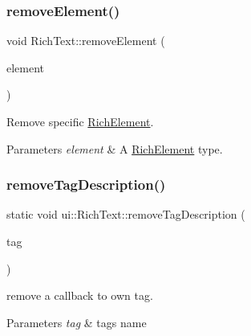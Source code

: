 \subsubsection{\texorpdfstring{remove\+Element()}{removeElement()}\hspace{0.1cm}{\footnotesize\ttfamily [4/4]}}
{\footnotesize\ttfamily void Rich\+Text\+::remove\+Element (\begin{DoxyParamCaption}\item[{\hyperlink{classui_1_1RichElement}{Rich\+Element} $\ast$}]{element }\end{DoxyParamCaption})}



Remove specific \hyperlink{classui_1_1RichElement}{Rich\+Element}. 


\begin{DoxyParams}{Parameters}
{\em element} & A \hyperlink{classui_1_1RichElement}{Rich\+Element} type. \\
\hline
\end{DoxyParams}
\mbox{\label{classui_1_1RichText_a28cf05a1a014f4845544f3664ba4c8fb}} 
\subsubsection{\texorpdfstring{remove\+Tag\+Description()}{removeTagDescription()}\hspace{0.1cm}{\footnotesize\ttfamily [1/2]}}
{\footnotesize\ttfamily static void ui\+::\+Rich\+Text\+::remove\+Tag\+Description (\begin{DoxyParamCaption}\item[{const std\+::string \&}]{tag }\end{DoxyParamCaption})\hspace{0.3cm}{\ttfamily [static]}}



remove a callback to own tag. 


\begin{DoxyParams}{Parameters}
{\em tag} & tag\textquotesingle{}s name \\
\hline
\end{DoxyParams}
\mbox{\label{classui_1_1RichText_a3f03f9553cb5f1036b7a6645c5eb842a}} 
